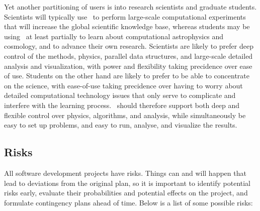 \documentclass[11pt]{article}
\begin{document}
    Yet another partitioning of users is into research scientists and
    graduate students.  Scientists will typically use \cello\ to
    perform large-scale computational experiments that will increase
    the global scientific knowledge base, whereas students may be
    using \cello\ at least partially to learn about computational
    astrophysics and cosmology, and to advance their own research.
    Scientists are likely to prefer deep control of the methods,
    physics, parallel data structures, and large-scale detailed
    analysis and visualization, with power and flexibility taking
    precidence over ease of use.  Students on the other hand are
    likely to prefer to be able to concentrate on the science, with
    ease-of-use taking precidence over having to worry about detailed
    computational technology issues that only serve to complicate and
    interfere with the learning process.  \cello\ should therefore
    support both deep and flexible control over physics, algorithms,
    and analysis, while simultaneously be easy to set up problems, and
    easy to run, analyse, and visualize the results.
    

\subsection{Risks}

   All software development projects have risks.  Things can and will
   happen that lead to deviations from the original plan, so it is
   important to identify potential risks early, evaluate their
   probabilities and potential effects on the project, and formulate
   contingency plans ahead of time.  Below is a list of some possible
   risks:
\end{document}
